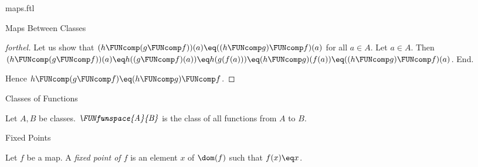 \documentclass{naproche-library}
\begin{document}
\begin{smodule}[title=Maps]{maps.ftl}
\begin{sfragment}{Maps Between Classes}
\begin{proof}[forthel]
    Let us show that $(h \FUNcomp (g \FUNcomp f))(a) \eq ((h \FUNcomp g) \FUNcomp f)(a)$ for all $a \in A$.
      Let $a \in A$.
      Then $(h \FUNcomp (g \FUNcomp f))(a)
        \eq h((g \FUNcomp f)(a))
        \eq h(g(f(a)))
        \eq (h \FUNcomp g)(f(a))
        \eq ((h \FUNcomp g) \FUNcomp f)(a)$.
    End.

    Hence $h \FUNcomp (g \FUNcomp f) \eq (h \FUNcomp g) \FUNcomp f$.
  \end{proof}
\end{sfragment}

\begin{sfragment}{Classes of Functions}
  \begin{definition}[forthel,id=FOUNDATIONS_06_5119110467813376]
    Let $A, B$ be classes.
    $\emph{\FUNfunspace{A}{B}}$ is the class of all functions from $A$ to $B$.
  \end{definition}
\end{sfragment}

\begin{sfragment}{Fixed Points}
  \begin{definition}[forthel,id=FOUNDATIONS_06_2177076576649216]
    Let $f$ be a map.
    A \emph{fixed point of $f$} is an element $x$ of $\dom(f)$ such that $f(x) \eq x$.
  \end{definition}
\end{sfragment}
\end{smodule}
\end{document}
